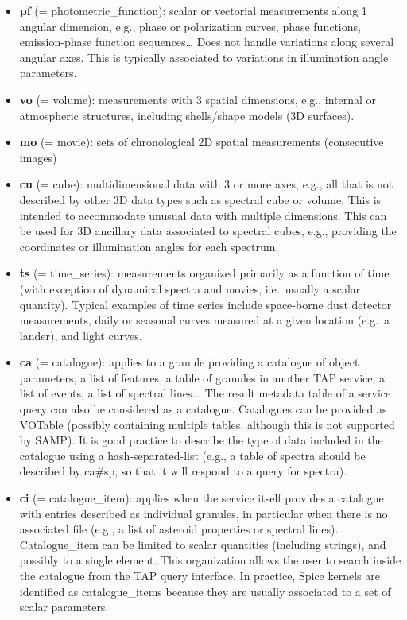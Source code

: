 \documentclass[11pt,a4paper]{ivoa}
\begin{document}
\begin{itemize}
\item \textbf{pf }(= photometric\_function): scalar or vectorial
measurements along 1 angular dimension, e.g., phase or polarization
curves, phase functions, emission-phase function sequences… Does not
handle variations along several angular axes. This is typically associated
to variations in illumination angle parameters.

\item \textbf{vo }(= volume): measurements with 3 spatial dimensions,
e.g., internal or atmospheric structures, including shells/shape models
(3D surfaces).

\item \textbf{mo }(= movie): sets of chronological 2D spatial measurements
(consecutive images)

\item \textbf{cu }(= cube): multidimensional data with 3 or more axes,
e.g., all that is not described by other 3D data types such as spectral
cube or volume. This is intended to accommodate unusual data with multiple
dimensions. This can be used for 3D ancillary data associated to spectral
cubes, e.g., providing the coordinates or illumination angles for
each spectrum.

\item \textbf{ts }(= time\_series): measurements organized primarily
as a function of time (with exception of dynamical spectra and movies,
i.e.\ usually a scalar quantity). Typical examples of time series include
space-borne dust detector measurements, daily or seasonal curves measured
at a given location (e.g.\ a lander), and light curves.

\item \textbf{ca }(= catalogue): applies to a granule providing a
catalogue of object parameters, a list of features, a table of granules
in another TAP service, a list of events, a list of spectral lines... The
result metadata table of a service query can also be considered as a
catalogue. Catalogues can be provided as VOTable (possibly containing
multiple tables, although this is not supported by SAMP). It is good
practice to describe the type of data included in the catalogue using
a hash-separated-list (e.g., a table of spectra should be described by
ca\#sp, so that it will respond to a query for spectra).

\item \textbf{ci }(= catalogue\_item): applies when the service itself
provides a catalogue with entries described as individual granules, in
particular when there is no associated file (e.g., a list of asteroid
properties or spectral lines). Catalogue\_item can be limited to scalar
quantities (including strings), and possibly to a single element. This
organization allows the user to search inside the catalogue from
the TAP query interface. In practice, Spice kernels are identified as
catalogue\_items because they are usually associated to a set of scalar
parameters.


\end{itemize}
\end{document}
